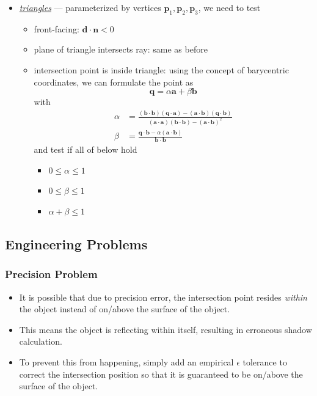 \documentclass[twocolumn,landscape,10pt]{article}
\theoremstyle{definition}
\begin{document}
\begin{itemize}
    \item \underline{\emph{triangles}} --- parameterized by vertices
        $\mathbf{p}_1,\mathbf{p}_2,\mathbf{p}_3$, we need to test
        \begin{itemize}
            \item front-facing: $\mathbf{d}\cdot\mathbf{n}<0$
            \item plane of triangle intersects ray: same as before
            \item intersection point is inside triangle: using the concept of
                barycentric coordinates, we can formulate the point as
                \[
                    \mathbf{q}=\alpha\mathbf{a}+\beta\mathbf{b}
                \]
                with
                \begin{align*}
                    \alpha
                    & =
                    \frac{(\mathbf{b}\cdot\mathbf{b})(\mathbf{q}\cdot\mathbf{a})
                    -(\mathbf{a}\cdot\mathbf{b})(\mathbf{q}\cdot\mathbf{b})}
                    {(\mathbf{a}\cdot\mathbf{a})(\mathbf{b}\cdot\mathbf{b})-{(\mathbf{a}\cdot\mathbf{b})}^{2}}\\
                    \beta
                    & =
                    \frac{\mathbf{q}\cdot\mathbf{b}-\alpha(\mathbf{a}\cdot\mathbf{b})}
                    {\mathbf{b}\cdot\mathbf{b}}
                \end{align*} 
                and test if all of below hold
                \begin{itemize}
                    \item $0\le\alpha\le 1$
                    \item $0\le\beta\le 1$
                    \item $\alpha+\beta\le 1$
                \end{itemize} 
        \end{itemize} 
\end{itemize} 


\subsection{Engineering Problems}

\subsubsection{Precision Problem}

\begin{itemize}
    \item It is possible that due to precision error, the intersection point
        resides \emph{within} the object instead of on/above the surface of the
        object.
    \item This means the object is reflecting within itself, resulting in
        erroneous shadow calculation.
    \item To prevent this from happening, simply add an empirical $\epsilon$
        tolerance to correct the intersection position so that it is guaranteed
        to be on/above the surface of the object.
\end{itemize} 
\end{document}
